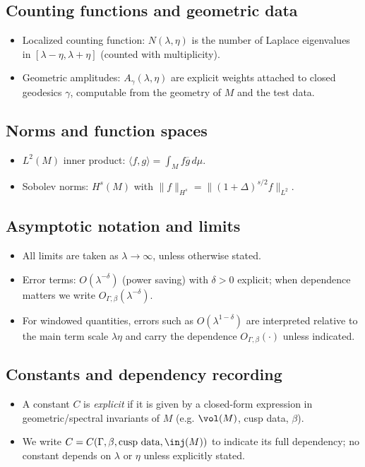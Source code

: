 \subsection*{Counting functions and geometric data}
\begin{itemize}
  \item Localized counting function: $N(\lambda,\eta)$ is the number of Laplace eigenvalues in $[\lambda-\eta,\lambda+\eta]$ (counted with multiplicity).
  \item Geometric amplitudes: $A_\gamma(\lambda,\eta)$ are explicit weights attached to closed geodesics $\gamma$, computable from the geometry of $M$ and the test data.
\end{itemize}

\subsection*{Norms and function spaces}
\begin{itemize}
  \item $L^2(M)$ inner product: $\langle f,g\rangle=\int_M f\overline{g}\,d\mu$.
  \item Sobolev norms: $H^s(M)$ with $\|f\|_{H^s}=\|(1+\Delta)^{s/2}f\|_{L^2}$.
\end{itemize}

\subsection*{Asymptotic notation and limits}
\begin{itemize}
  \item All limits are taken as $\lambda\to\infty$, unless otherwise stated.
  \item Error terms: $O(\lambda^{-\delta})$ (power saving) with $\delta>0$ explicit; when dependence matters we write $O_{\Gamma,\beta}(\lambda^{-\delta})$.
  \item For windowed quantities, errors such as $O(\lambda^{1-\delta})$ are interpreted relative to the main term scale $\lambda\eta$ and carry the dependence $O_{\Gamma,\beta}(\cdot)$ unless indicated.
\end{itemize}

\subsection*{Constants and dependency recording}
\begin{itemize}
  \item A constant $C$ is \emph{explicit} if it is given by a closed-form expression in geometric/spectral invariants of $M$ (e.g. $\vol(M)$, cusp data, $\beta$).
  \item We write $C=C(\Gamma,\beta,\text{cusp data},\inj(M))$ to indicate its full dependency; no constant depends on $\lambda$ or $\eta$ unless explicitly stated.
\end{itemize}

